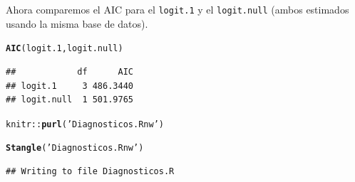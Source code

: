 \documentclass[onesided]{article}\usepackage[]{graphicx}\usepackage[]{color}
\makeatletter
\newcommand{\hlstr}[1]{\textcolor[rgb]{0.192,0.494,0.8}{#1}}%
\newcommand{\hlopt}[1]{\textcolor[rgb]{0,0,0}{#1}}%
\newcommand{\hlstd}[1]{\textcolor[rgb]{0.345,0.345,0.345}{#1}}%
\newcommand{\hlkwd}[1]{\textcolor[rgb]{0.737,0.353,0.396}{\textbf{#1}}}%
\newenvironment{kframe}{%
 \def\at@end@of@kframe{}%
 \ifinner\ifhmode%
  \def\at@end@of@kframe{\end{minipage}}%
  \begin{minipage}{\columnwidth}%
 \fi\fi%
 \def\FrameCommand##1{\hskip\@totalleftmargin \hskip-\fboxsep
 \colorbox{shadecolor}{##1}\hskip-\fboxsep
     \hskip-\linewidth \hskip-\@totalleftmargin \hskip\columnwidth}%
 \MakeFramed {\advance\hsize-\width
   \@totalleftmargin\z@ \linewidth\hsize
   \@setminipage}}%
 {\par\unskip\endMakeFramed%
 \at@end@of@kframe}
\newenvironment{knitrout}{}{} %
\makeatother
\begin{document}
Ahora comparemos el AIC para el \texttt{logit.1} y el \texttt{logit.null} (ambos estimados usando la misma base de datos). 

\begin{knitrout}
\color{fgcolor}\begin{kframe}
\begin{alltt}
\hlkwd{AIC}\hlstd{(logit.1,logit.null)}
\end{alltt}
\begin{verbatim}
##            df      AIC
## logit.1     3 486.3440
## logit.null  1 501.9765
\end{verbatim}
\end{kframe}
\end{knitrout}


\begin{knitrout}
\color{fgcolor}\begin{kframe}
\begin{alltt}
\hlstd{knitr}\hlopt{::}\hlkwd{purl}\hlstd{(}\hlstr{'Diagnosticos.Rnw'}\hlstd{)}
\end{alltt}


{\ttfamily\noindent\bfseries{}}\begin{alltt}
\hlkwd{Stangle}\hlstd{(}\hlstr{'Diagnosticos.Rnw'}\hlstd{)}
\end{alltt}
\begin{verbatim}
## Writing to file Diagnosticos.R
\end{verbatim}
\end{kframe}
\end{knitrout}




\end{document}
